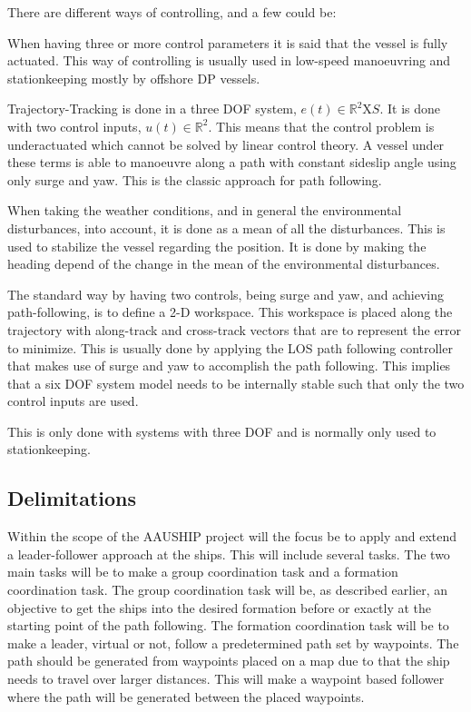 There are different ways of controlling, and a few could be:
\begin{description}[style=nextline]
	\item [Three or more controls]
	When having three or more control parameters it is said that the vessel is fully actuated. This way of controlling is usually used in low-speed manoeuvring and stationkeeping mostly by offshore \ac{DP} vessels.
	\item [Two controls and Trajectory-Tracking control]
	Trajectory-Tracking is done in a three \ac{DOF} system, $e(t)\in\mathds{R}^2\text{X}S$. It is done with two control inputs, $u(t)\in\mathds{R}^2$. This means that the control problem is underactuated which cannot be solved by linear control theory. A vessel under these terms is able to manoeuvre along a path with constant sideslip angle using only surge and yaw. This is the classic approach for path following.
	\item [Two controls and Weather-Optimal heading]
	When taking the weather conditions, and in general the environmental disturbances, into account, it is done as a mean of all the disturbances. This is used to stabilize the vessel regarding the position. It is done by making the heading depend of the change in the mean of the environmental disturbances.
	\item [Two controls and Path-Following control]
	The standard way by having two controls, being surge and yaw, and achieving path-following, is to define a 2-D workspace. This workspace is placed along the trajectory with along-track and cross-track vectors that are to represent the error to minimize. This is usually done by applying the \ac{LOS} path following controller that makes use of surge and yaw to accomplish the path following. This implies that a six \ac{DOF} system model needs to be internally stable such that only the two control inputs are used.
	\item [One control]
	This is only done with systems with three \ac{DOF} and is normally only used to stationkeeping.
\end{description}
\citep{fossen}

\subsection{Delimitations}
Within the scope of the AAUSHIP project will the focus be to apply and extend a leader-follower approach at the ships. This will include several tasks. The two main tasks will be to make a group coordination task and a formation coordination task. The group coordination task will be, as described earlier, an objective to get the ships into the desired formation before or exactly at the starting point of the path following. The formation coordination task will be to make a leader, virtual or not, follow a predetermined path set by waypoints. The path should be generated from waypoints placed on a map due to that the ship needs to travel over larger distances. This will make a waypoint based follower where the path will be generated between the placed waypoints.

